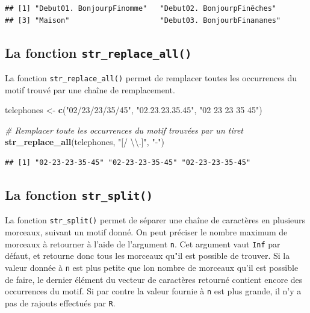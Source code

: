 \documentclass[
  11pt,
]{book}
\newenvironment{Shaded}{\begin{snugshade}}{\end{snugshade}}
\newcommand{\CharTok}[1]{\textcolor[rgb]{0.31,0.60,0.02}{#1}}
\newcommand{\CommentTok}[1]{\textcolor[rgb]{0.56,0.35,0.01}{\textit{#1}}}
\newcommand{\KeywordTok}[1]{\textcolor[rgb]{0.13,0.29,0.53}{\textbf{#1}}}
\newcommand{\NormalTok}[1]{#1}
\newcommand{\StringTok}[1]{\textcolor[rgb]{0.31,0.60,0.02}{#1}}
\numberwithin{equation}{section}
\numberwithin{countremarque}{section}
\begin{document}
\begin{lstlisting}
## [1] "Debut01. BonjourpFinomme"   "Debut02. BonjourpFinêches" 
## [3] "Maison"                     "Debut03. BonjourbFinananes"
\end{lstlisting}

\hypertarget{manip_regex_stringr_replace_all}{%
\subsection{\texorpdfstring{La fonction \texttt{str\_replace\_all()}}{La fonction str\_replace\_all()}}\label{manip_regex_stringr_replace_all}}

La fonction \texttt{str\_replace\_all()} permet de remplacer toutes les occurrences du motif trouvé par une chaîne de remplacement.

\begin{Shaded}
\begin{Highlighting}[]
\NormalTok{telephones \textless{}{-}}\StringTok{ }\KeywordTok{c}\NormalTok{(}\StringTok{"02/23/23/35/45"}\NormalTok{, }\StringTok{"02.23.23.35.45"}\NormalTok{, }\StringTok{"02 23 23 35 45"}\NormalTok{)}

\CommentTok{\# Remplacer toute les occurrences du motif trouvées par un tiret}
\KeywordTok{str\_replace\_all}\NormalTok{(telephones, }\StringTok{"[/ }\CharTok{\textbackslash{}\textbackslash{}}\StringTok{.]"}\NormalTok{, }\StringTok{"{-}"}\NormalTok{)}
\end{Highlighting}
\end{Shaded}

\begin{lstlisting}
## [1] "02-23-23-35-45" "02-23-23-35-45" "02-23-23-35-45"
\end{lstlisting}

\hypertarget{manip_regex_stringr_split}{%
\subsection{\texorpdfstring{La fonction \texttt{str\_split()}}{La fonction str\_split()}}\label{manip_regex_stringr_split}}

La fonction \texttt{str\_split()} permet de séparer une chaîne de caractères en plusieurs morceaux, suivant un motif donné. On peut préciser le nombre maximum de morceaux à retourner à l'aide de l'argument \texttt{n}. Cet argument vaut \texttt{Inf} par défaut, et retourne donc tous les morceaux qu"il est possible de trouver. Si la valeur donnée à \texttt{n} est plus petite que lon nombre de morceaux qu'il est possible de faire, le dernier élément du vecteur de caractères retourné contient encore des occurrences du motif. Si par contre la valeur fournie à \texttt{n} est plus grande, il n'y a pas de rajouts effectués par \texttt{R}.
\end{document}
